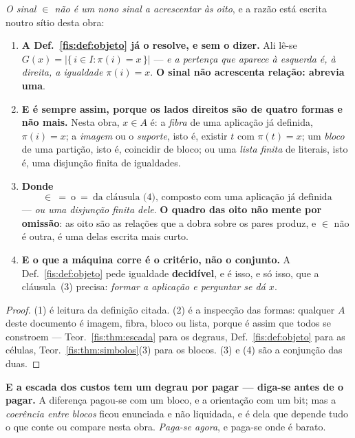 \documentclass[livro.tex]{subfiles}
\begin{document}
\begin{corolario}\label{fis:cor:pertenca}
\emph{O sinal $\in$ não é um nono sinal a acrescentar às oito}, e a razão está
escrita noutro sítio desta obra:
\begin{enumerate}\itemsep3pt
\item[(1)] \textbf{A Def.~\ref{fis:def:objeto} já o resolve, e sem o dizer.} Ali
lê-se $G(x)=\bigl\lvert\{\,i\in I:\pi(i)=x\,\}\bigr\rvert$ --- \emph{e a pertença
que aparece à esquerda é, à direita, a igualdade $\pi(i)=x$}. \textbf{O sinal não
acrescenta relação: abrevia uma}.
\item[(2)] \textbf{E é sempre assim, porque os lados direitos são de quatro
formas e não mais.} Nesta obra, $x\in A$ é: a \emph{fibra} de uma aplicação já
definida, $\pi(i)=x$; a \emph{imagem} ou o \emph{suporte}, isto é, existir $t$ com
$\pi(t)=x$; um \emph{bloco} de uma partição, isto é, coincidir de bloco; ou uma
\emph{lista finita} de literais, isto é, uma disjunção finita de igualdades.
\item[(3)] \textbf{Donde}
\[
\boxed{\;\in\ =\ \text{o}\ =\ \text{da cláusula~(4), composto com uma aplicação já definida}\;}
\]
--- \emph{ou uma disjunção finita dele}. \textbf{O quadro das oito não mente por
omissão}: as oito são as relações que a dobra sobre os pares produz, e $\in$ não é
outra, é uma delas escrita mais curto.
\item[(4)] \textbf{E o que a máquina corre é o critério, não o conjunto.} A
Def.~\ref{fis:def:objeto} pede igualdade \textbf{decidível}, e é isso, e só isso,
que a cláusula~(3) precisa: \emph{formar a aplicação e perguntar se dá $x$}.
\end{enumerate}
\end{corolario}

\begin{proof}
(1) é leitura da definição citada. (2) é a inspecção das formas: qualquer $A$ deste
documento é imagem, fibra, bloco ou lista, porque é assim que todos se constroem
--- Teor.~\ref{fis:thm:escada} para os degraus, Def.~\ref{fis:def:objeto} para as
células, Teor.~\ref{fis:thm:simbolos}(3) para os blocos. (3) e (4) são a conjunção
das duas.
\end{proof}

\medskip\noindent\textbf{E a escada dos custos tem um degrau por pagar --- diga-se
antes de o pagar.} A diferença pagou-se com um bloco, e a orientação com um bit;
mas a \emph{coerência entre blocos} ficou enunciada e não liquidada, e é dela que
depende tudo o que conte ou compare nesta obra. \emph{Paga-se agora}, e paga-se
onde é barato.
\end{document}
